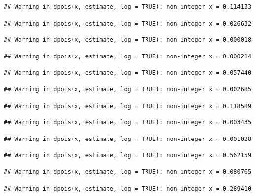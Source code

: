 \documentclass[]{article}
\begin{document}
\begin{verbatim}
## Warning in dpois(x, estimate, log = TRUE): non-integer x = 0.114133
\end{verbatim}

\begin{verbatim}
## Warning in dpois(x, estimate, log = TRUE): non-integer x = 0.026632
\end{verbatim}

\begin{verbatim}
## Warning in dpois(x, estimate, log = TRUE): non-integer x = 0.000018
\end{verbatim}

\begin{verbatim}
## Warning in dpois(x, estimate, log = TRUE): non-integer x = 0.000214
\end{verbatim}

\begin{verbatim}
## Warning in dpois(x, estimate, log = TRUE): non-integer x = 0.057440
\end{verbatim}

\begin{verbatim}
## Warning in dpois(x, estimate, log = TRUE): non-integer x = 0.002685
\end{verbatim}

\begin{verbatim}
## Warning in dpois(x, estimate, log = TRUE): non-integer x = 0.118589
\end{verbatim}

\begin{verbatim}
## Warning in dpois(x, estimate, log = TRUE): non-integer x = 0.003435
\end{verbatim}

\begin{verbatim}
## Warning in dpois(x, estimate, log = TRUE): non-integer x = 0.001028
\end{verbatim}

\begin{verbatim}
## Warning in dpois(x, estimate, log = TRUE): non-integer x = 0.562159
\end{verbatim}

\begin{verbatim}
## Warning in dpois(x, estimate, log = TRUE): non-integer x = 0.080765
\end{verbatim}

\begin{verbatim}
## Warning in dpois(x, estimate, log = TRUE): non-integer x = 0.289410
\end{verbatim}
\end{document}
